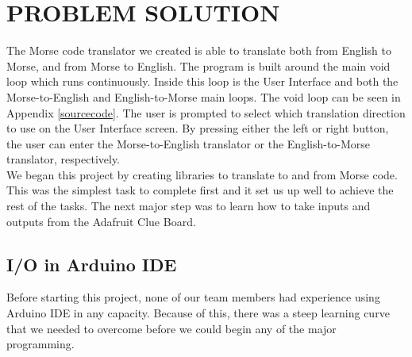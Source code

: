 \documentclass[12pt]{article}
\begin{document}
\section{PROBLEM SOLUTION}
The Morse code translator we created is able to translate both from English to Morse, and from Morse to English. The program is built around the main void loop which runs continuously. Inside this loop is the User Interface and both the Morse-to-English and English-to-Morse main loops. The void loop can be seen in Appendix \ref{sourcecode}. The user is prompted to select which translation direction to use on the User Interface screen. By pressing either the left or right button, the user can enter the Morse-to-English translator or the English-to-Morse translator, respectively.\\

We began this project by creating libraries to translate to and from Morse code. This was the simplest task to complete first and it set us up well to achieve the rest of the tasks. The next major step was to learn how to take inputs and outputs from the Adafruit Clue Board.
\subsection{I/O in Arduino IDE}
Before starting this project, none of our team members had experience using Arduino IDE in any capacity. Because of this, there was a steep learning curve that we needed to overcome before we could begin any of the major programming. 
\end{document}
